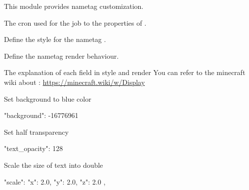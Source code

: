 This module provides nametag customization.

\begin{Configuration}
    \item[update\_cron]{
        The cron used for the job to  the properties of .
    }

    \item[style]{
        Define the style for the nametag .
    }

    \item[render]{
        Define the nametag render behaviour.
        \begin{note}{The explanation of each field in style and render}
            You can refer to the minecraft wiki about : \url{https://minecraft.wiki/w/Display}
        \end{note}
    }
\end{Configuration}

\begin{example}{Set background to blue color}
    \begin{jsoncode}
        "background": -16776961
    \end{jsoncode}
\end{example}

\begin{example}{Set half transparency}
    \begin{jsoncode}
        "text_opacity": 128
    \end{jsoncode}
\end{example}

\begin{example}{Scale the size of text into double}
    \begin{jsoncode}
        "scale": {
            "x": 2.0,
            "y": 2.0,
            "z": 2.0
        },
    \end{jsoncode}

\end{example}

